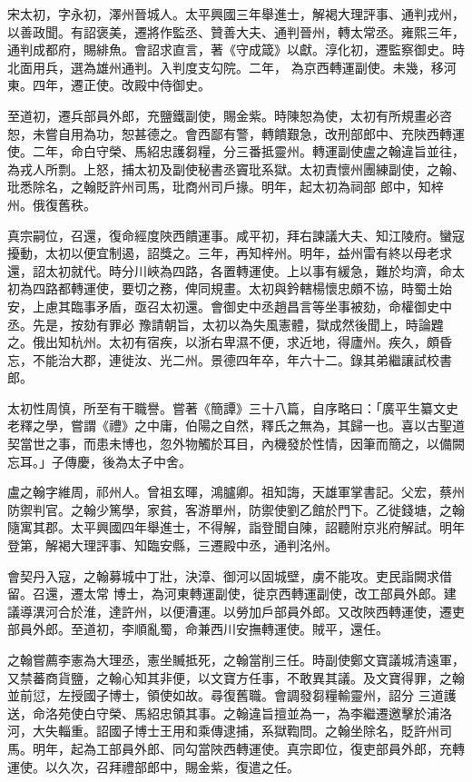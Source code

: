 \begin{pinyinscope}
 宋太初，字永初，澤州晉城人。太平興國三年舉進士，解褐大理評事、通判戎州，以善政聞。有詔褒美，遷將作監丞、贊善大夫、通判晉州，轉太常丞。雍熙三年，通判成都府，賜緋魚。會詔求直言，著《守成箴》以獻。淳化初，遷監察御史。時北面用兵，選為雄州通判。入判度支勾院。二年，
 為京西轉運副使。未幾，移河東。四年，遷正使。改殿中侍御史。



 至道初，遷兵部員外郎，充鹽鐵副使，賜金紫。時陳恕為使，太初有所規畫必咨恕，未嘗自用為功，恕甚德之。會西鄙有警，轉饋艱急，改刑部郎中、充陜西轉運使。二年，命白守榮、馬紹忠護芻糧，分三番抵靈州。轉運副使盧之翰違旨並往，為戎人所剽。上怒，捕太初及副使秘書丞竇玭系獄。太初責懷州團練副使，之翰、玭悉除名，之翰貶許州司馬，玭商州司戶掾。明年，起太初為祠部
 郎中，知梓州。俄復舊秩。



 真宗嗣位，召還，復命經度陜西饋運事。咸平初，拜右諫議大夫、知江陵府。蠻寇擾動，太初以便宜制遏，詔獎之。三年，再知梓州。明年，益州雷有終以母老求還，詔太初就代。時分川峽為四路，各置轉運使。上以事有緩急，難於均濟，命太初為四路都轉運使，要切之務，俾同規畫。太初與鈐轄楊懷忠頗不協，時蜀土始安，上慮其臨事矛盾，亟召太初還。會御史中丞趙昌言等坐事被劾，命權御史中丞。先是，按劾有罪必
 豫請朝旨，太初以為失風憲體，獄成然後聞上，時論韙之。俄出知杭州。太初有宿疾，以浙右卑濕不便，求近地，得廬州。疾久，頗昏忘，不能治大郡，連徙汝、光二州。景德四年卒，年六十二。錄其弟繼讓試校書郎。



 太初性周慎，所至有干職譽。嘗著《簡譚》三十八篇，自序略曰：「廣平生纂文史老釋之學，嘗謂《禮》之中庸，伯陽之自然，釋氏之無為，其歸一也。喜以古聖道契當世之事，而患未博也，忽外物觸於耳目，內機發於性情，因筆而簡之，以備闕
 忘耳。」子傳慶，後為太子中舍。



 盧之翰字維周，祁州人。曾祖玄暉，鴻臚卿。祖知誨，天雄軍掌書記。父宏，蔡州防禦判官。之翰少篤學，家貧，客游單州，防禦使劉乙館於門下。乙徙錢塘，之翰隨寓其郡。太平興國四年舉進士，不得解，詣登聞自陳，詔聽附京兆府解試。明年登第，解褐大理評事、知臨安縣，三遷殿中丞，通判洺州。



 會契丹入寇，之翰募城中丁壯，決漳、御河以固城壁，虜不能攻。吏民詣闕求借留。召還，遷太常
 博士，為河東轉運副使，徙京西轉運副使，改工部員外郎。建議導潩河合於淮，達許州，以便漕運。以勞加戶部員外郎。又改陜西轉運使，遷吏部員外郎。至道初，李順亂蜀，命兼西川安撫轉運使。賊平，還任。



 之翰嘗薦李憲為大理丞，憲坐贓抵死，之翰當削三任。時副使鄭文寶議城清遠軍，又禁蕃商貨鹽，之翰心知其非便，以文寶方任事，不敢異其議。及文寶得罪，之翰並前愆，左授國子博士，領使如故。尋復舊職。會調發芻糧輸靈州，詔分
 三道護送，命洛苑使白守榮、馬紹忠領其事。之翰違旨擅並為一，為李繼遷邀擊於浦洛河，大失輜重。詔國子博士王用和乘傳逮捕，系獄鞫問。之翰坐除名，貶許州司馬。明年，起為工部員外郎、同勾當陜西轉運使。真宗即位，復吏部員外郎，充轉運使。以久次，召拜禮部郎中，賜金紫，復遣之任。




\end{pinyinscope}

